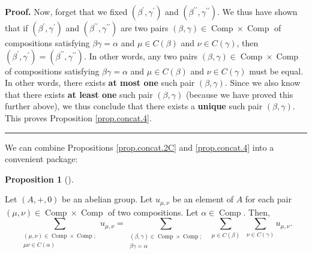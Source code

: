 \documentclass[numbers=enddot,12pt,final,onecolumn,notitlepage]{scrartcl}%
\theoremstyle{definition}
\newtheorem{prop}[theo]{Proposition}
\newenvironment{proposition}[1][]
{\begin{prop}[#1]\begin{leftbar}}
{\end{leftbar}\end{prop}}
\newenvironment{proof}[1][Proof]{\noindent\textbf{#1.} }{\ \rule{0.5em}{0.5em}}
\let\sumnonlimits\sum
\renewcommand{\sum}{\sumnonlimits\limits}
\begin{document}
\begin{proof}
Now, forget that we fixed $\left(  \beta^{\prime},\gamma^{\prime}\right)  $
and $\left(  \beta^{\prime\prime},\gamma^{\prime\prime}\right)  $. We thus
have shown that if $\left(  \beta^{\prime},\gamma^{\prime}\right)  $ and
$\left(  \beta^{\prime\prime},\gamma^{\prime\prime}\right)  $ are two pairs
$\left(  \beta,\gamma\right)  \in\operatorname*{Comp}\times
\operatorname*{Comp}$ of compositions satisfying $\beta\gamma=\alpha$ and
$\mu\in C\left(  \beta\right)  $ and $\nu\in C\left(  \gamma\right)  $, then
$\left(  \beta^{\prime},\gamma^{\prime}\right)  =\left(  \beta^{\prime\prime
},\gamma^{\prime\prime}\right)  $. In other words, any two pairs $\left(
\beta,\gamma\right)  \in\operatorname*{Comp}\times\operatorname*{Comp}$ of
compositions satisfying $\beta\gamma=\alpha$ and $\mu\in C\left(
\beta\right)  $ and $\nu\in C\left(  \gamma\right)  $ must be equal. In other
words, there exists \textbf{at most one} such pair $\left(  \beta
,\gamma\right)  $. Since we also know that there exists \textbf{at least one}
such pair $\left(  \beta,\gamma\right)  $ (because we have proved this further
above), we thus conclude that there exists a \textbf{unique} such pair
$\left(  \beta,\gamma\right)  $. This proves Proposition \ref{prop.concat.4}.
\end{proof}

We can combine Propositions \ref{prop.concat.2C} and \ref{prop.concat.4} into
a convenient package:

\begin{proposition}
\label{prop.concat.sum=sum}Let $\left(  A,+,0\right)  $ be an abelian group.
Let $u_{\mu,\nu}$ be an element of $A$ for each pair $\left(  \mu,\nu\right)
\in\operatorname*{Comp}\times\operatorname*{Comp}$ of two compositions. Let
$\alpha\in\operatorname*{Comp}$. Then,%
\[
\sum_{\substack{\left(  \mu,\nu\right)  \in\operatorname*{Comp}\times
\operatorname*{Comp};\\\mu\nu\in C\left(  \alpha\right)  }}u_{\mu,\nu}%
=\sum_{\substack{\left(  \beta,\gamma\right)  \in\operatorname*{Comp}%
\times\operatorname*{Comp};\\\beta\gamma=\alpha}}\ \ \sum_{\mu\in C\left(
\beta\right)  }\ \ \sum_{\nu\in C\left(  \gamma\right)  }u_{\mu,\nu}.
\]

\end{proposition}
\end{document}
